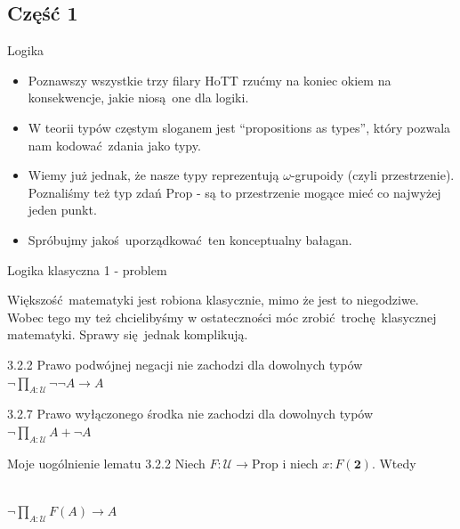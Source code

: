 \documentclass{beamer}
\newcommand{\U}{\mathcal{U}}
\newcommand{\Prop}{\text{Prop}}
\begin{document}
\subsection{Część 1}

\begin{frame}{Logika}
\begin{itemize}
	\item Poznawszy wszystkie trzy filary HoTT rzućmy na koniec okiem na konsekwencje, jakie niosą one dla logiki.
	\item W teorii typów częstym sloganem jest ``propositions as types'', który pozwala nam kodować zdania jako typy.
	\item Wiemy już jednak, że nasze typy reprezentują $\omega$-grupoidy (czyli przestrzenie). Poznaliśmy też typ zdań $\Prop$ - są to przestrzenie mogące mieć co najwyżej jeden punkt.
	\item Spróbujmy jakoś uporządkować ten konceptualny bałagan.
\end{itemize}
\end{frame}

\begin{frame}{Logika klasyczna 1 - problem}

Większość matematyki jest robiona klasycznie, mimo że jest to niegodziwe. Wobec tego my też chcielibyśmy w ostateczności móc zrobić trochę klasycznej matematyki. Sprawy się jednak komplikują.

\begin{block}{3.2.2 Prawo podwójnej negacji nie zachodzi dla dowolnych typów}
$\neg \prod_{A : \U} \neg\neg A \to A$
\end{block}

\begin{block}{3.2.7 Prawo wyłączonego środka nie zachodzi dla dowolnych typów}
$\neg \prod_{A : \U} A + \neg A$
\end{block}

\begin{block}{Moje uogólnienie lematu 3.2.2}
Niech $F : \U \to \Prop$ i niech $x : F(\textbf{2})$. Wtedy \\~\

$\neg \prod_{A : \U} F(A) \to A$
\end{block}

\end{frame}
\end{document}
